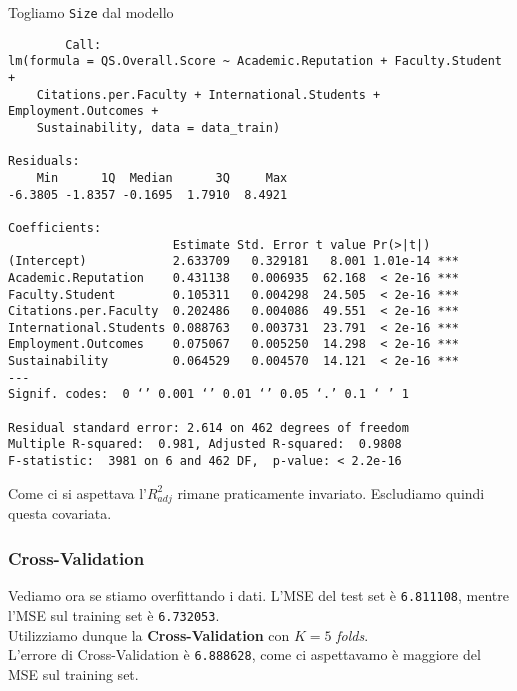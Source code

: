 \documentclass{beamer}
\newcommand{\fg}[2]{%
  \begin{center}
      \texttt{[image: \#2]}%
  \end{center}
}
\begin{document}
\begin{frame}[fragile]
	Togliamo \texttt{Size} dal modello
	{\tiny
	\begin{verbatim}
		Call:
lm(formula = QS.Overall.Score ~ Academic.Reputation + Faculty.Student + 
    Citations.per.Faculty + International.Students + Employment.Outcomes + 
    Sustainability, data = data_train)

Residuals:
    Min      1Q  Median      3Q     Max 
-6.3805 -1.8357 -0.1695  1.7910  8.4921 

Coefficients:
                       Estimate Std. Error t value Pr(>|t|)    
(Intercept)            2.633709   0.329181   8.001 1.01e-14 ***
Academic.Reputation    0.431138   0.006935  62.168  < 2e-16 ***
Faculty.Student        0.105311   0.004298  24.505  < 2e-16 ***
Citations.per.Faculty  0.202486   0.004086  49.551  < 2e-16 ***
International.Students 0.088763   0.003731  23.791  < 2e-16 ***
Employment.Outcomes    0.075067   0.005250  14.298  < 2e-16 ***
Sustainability         0.064529   0.004570  14.121  < 2e-16 ***
---
Signif. codes:  0 ‘’ 0.001 ‘’ 0.01 ‘’ 0.05 ‘.’ 0.1 ‘ ’ 1

Residual standard error: 2.614 on 462 degrees of freedom
Multiple R-squared:  0.981,	Adjusted R-squared:  0.9808 
F-statistic:  3981 on 6 and 462 DF,  p-value: < 2.2e-16

	\end{verbatim}
	}
\end{frame}

\begin{frame}
	Come ci si aspettava l'$R^{2}_{adj}$ rimane praticamente invariato.
    \vspace*{1cm}
    Escludiamo quindi questa covariata.
\end{frame}


\begin{frame}[fragile]
\frametitle{Cross-Validation}
	Vediamo ora se stiamo overfittando i dati. L'MSE del test set è \texttt{6.811108}, mentre l'MSE sul training set è \texttt{6.732053}. \\
    Utilizziamo dunque la \textbf{Cross-Validation} con $K=5$ \textit{folds}. \\
    L'errore di Cross-Validation è \texttt{6.888628}, come ci aspettavamo è maggiore del MSE sul training set.
\end{frame}
\end{document}
